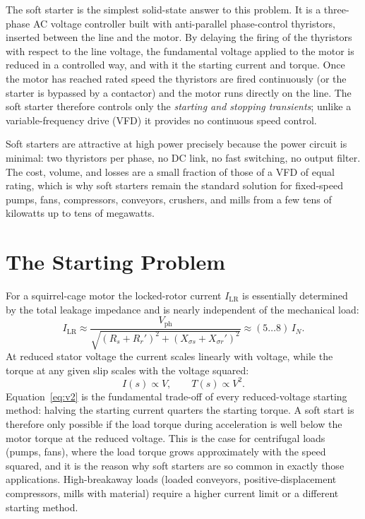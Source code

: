 \documentclass[11pt,a4paper]{article}
\begin{document}
The soft starter is the simplest solid-state answer to this problem. It is a
three-phase AC voltage controller built with anti-parallel phase-control
thyristors, inserted between the line and the motor. By delaying the firing
of the thyristors with respect to the line voltage, the fundamental voltage
applied to the motor is reduced in a controlled way, and with it the starting
current and torque. Once the motor has reached rated speed the thyristors are
fired continuously (or the starter is bypassed by a contactor) and the motor
runs directly on the line. The soft starter therefore controls only the
\emph{starting and stopping transients}; unlike a variable-frequency drive
(VFD) it provides no continuous speed control.

Soft starters are attractive at high power precisely because the power
circuit is minimal: two thyristors per phase, no DC link, no fast switching,
no output filter. The cost, volume, and losses are a small fraction of those
of a VFD of equal rating, which is why soft starters remain the standard
solution for fixed-speed pumps, fans, compressors, conveyors, crushers, and
mills from a few tens of kilowatts up to tens of megawatts.

\section{The Starting Problem}

For a squirrel-cage motor the locked-rotor current $I_\mathrm{LR}$ is
essentially determined by the total leakage impedance and is nearly
independent of the mechanical load:
\begin{equation}
  I_\mathrm{LR} \approx \frac{V_\mathrm{ph}}
  {\sqrt{(R_s + R_r')^2 + (X_{\sigma s} + X_{\sigma r}')^2}}
  \approx (5\ldots8)\,I_N .
\end{equation}
At reduced stator voltage the current scales linearly with voltage, while
the torque at any given slip scales with the voltage squared:
\begin{equation}
  I(s) \propto V, \qquad T(s) \propto V^2 .
  \label{eq:v2}
\end{equation}
Equation~\eqref{eq:v2} is the fundamental trade-off of every reduced-voltage
starting method: halving the starting current quarters the starting torque.
A soft start is therefore only possible if the load torque during
acceleration is well below the motor torque at the reduced voltage. This is
the case for centrifugal loads (pumps, fans), where the load torque grows
approximately with the speed squared, and it is the reason why soft starters
are so common in exactly those applications. High-breakaway loads (loaded
conveyors, positive-displacement compressors, mills with material) require a
higher current limit or a different starting method.
\end{document}
